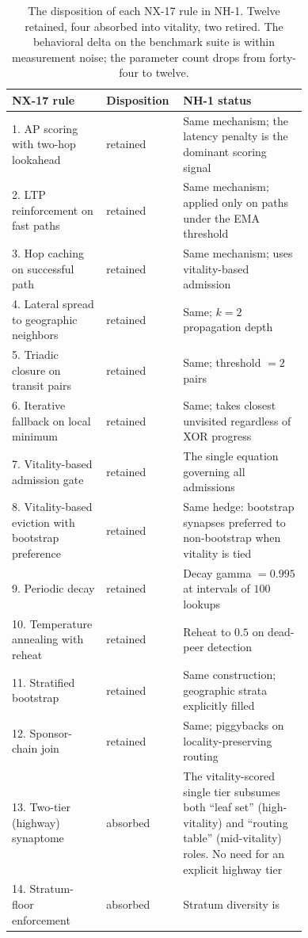 \documentclass[twoside,nobib]{tufte-book}
\begin{document}
\begin{table}[h]
\centering
\small
\caption{The disposition of each NX-17 rule in NH-1. Twelve
retained, four absorbed into vitality, two retired. The behavioral
delta on the benchmark suite is within measurement noise; the
parameter count drops from forty-four to twelve.}
\label{tab:nh1-mapping}
\begin{tabular}{@{}p{0.32\linewidth}lp{0.42\linewidth}@{}}
\toprule
\textbf{NX-17 rule} & \textbf{Disposition} & \textbf{NH-1 status} \\
\midrule
1. AP scoring with two-hop lookahead & retained & Same mechanism;
  the latency penalty is the dominant scoring signal \\
2. LTP reinforcement on fast paths & retained & Same mechanism;
  applied only on paths under the EMA threshold \\
3. Hop caching on successful path & retained & Same mechanism;
  uses vitality-based admission \\
4. Lateral spread to geographic neighbors & retained & Same;
  $k = 2$ propagation depth \\
5. Triadic closure on transit pairs & retained & Same; threshold
  $= 2$ pairs \\
6. Iterative fallback on local minimum & retained & Same; takes
  closest unvisited regardless of XOR progress \\
7. Vitality-based admission gate & retained & The single equation
  governing all admissions \\
8. Vitality-based eviction with bootstrap preference & retained &
  Same hedge: bootstrap synapses preferred to non-bootstrap when
  vitality is tied \\
9. Periodic decay & retained & Decay gamma $= 0.995$ at intervals
  of $100$ lookups \\
10. Temperature annealing with reheat & retained & Reheat to
  $0.5$ on dead-peer detection \\
11. Stratified bootstrap & retained & Same construction; geographic
  strata explicitly filled \\
12. Sponsor-chain join & retained & Same; piggybacks on
  locality-preserving routing \\
\midrule
13. Two-tier (highway) synaptome & absorbed & The vitality-scored
  single tier subsumes both ``leaf set'' (high-vitality) and
  ``routing table'' (mid-vitality) roles. No need for an explicit
  highway tier \\
14. Stratum-floor enforcement & absorbed & Stratum diversity is

\end{tabular}
\end{table}
\end{document}
